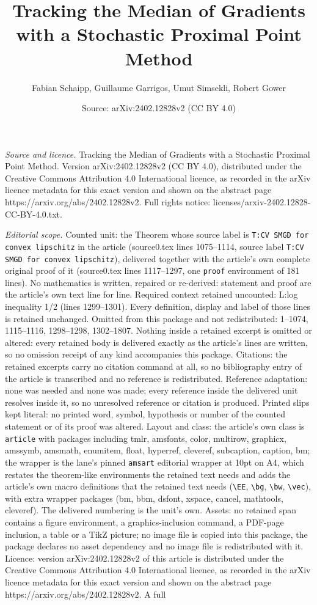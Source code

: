 \documentclass[10pt,a4paper]{amsart}
\title[Tracking the Median of Gradients with a Stochastic Proximal ]{Tracking the Median of Gradients with a Stochastic Proximal Point Method}
\author{Fabian Schaipp, Guillaume Garrigos, Umut Simsekli, Robert Gower}
\date{Source: arXiv:2402.12828v2 (CC BY 4.0)}
\begin{document}
\maketitle

\noindent\emph{Source and licence.} Tracking the Median of Gradients with a Stochastic Proximal Point Method. Version arXiv:2402.12828v2 (CC BY 4.0), distributed under the Creative Commons Attribution 4.0 International licence, as recorded in the arXiv licence metadata for this exact version and shown on the abstract page https://arxiv.org/abs/2402.12828v2. Full rights notice: licenses/arxiv-2402.12828-CC-BY-4.0.txt.\par\smallskip

\noindent\textit{Editorial scope.} Counted unit: the Theorem whose source label is \texttt{T:CV SMGD for convex lipschitz} in the article (source0.tex lines 1075--1114, source label \texttt{T:CV SMGD for convex lipschitz}), delivered together with the article's own complete original proof of it (source0.tex lines 1117--1297, one \texttt{proof} environment of 181 lines). No mathematics is written, repaired or re-derived: statement and proof are the article's own text line for line. Required context retained uncounted: L:log inequality 1/2 (lines 1299--1301). Every definition, display and label of those lines is retained unchanged. Omitted from this package and not redistributed: 1--1074, 1115--1116, 1298--1298, 1302--1807. Nothing inside a retained excerpt is omitted or altered: every retained body is delivered exactly as the article's lines are written, so no omission receipt of any kind accompanies this package. Citations: the retained excerpts carry no citation command at all, so no bibliography entry of the article is transcribed and no reference is redistributed. Reference adaptation: none was needed and none was made; every reference inside the delivered unit resolves inside it, so no unresolved reference or citation is produced. Printed slips kept literal: no printed word, symbol, hypothesis or number of the counted statement or of its proof was altered. Layout and class: the article's own class is \texttt{article} with packages including tmlr, amsfonts, color, multirow, graphicx, amssymb, amsmath, enumitem, float, hyperref, cleveref, subcaption, caption, bm; the wrapper is the lane's pinned \texttt{amsart} editorial wrapper at 10pt on A4, which restates the theorem-like environments the retained text needs and adds the article's own macro definitions that the retained text needs (\texttt{\textbackslash EE}, \texttt{\textbackslash bg}, \texttt{\textbackslash bw}, \texttt{\textbackslash vec}), with extra wrapper packages (bm, bbm, dsfont, xspace, cancel, mathtools, cleveref). The delivered numbering is the unit's own. Assets: no retained span contains a figure environment, a graphics-inclusion command, a PDF-page inclusion, a table or a TikZ picture; no image file is copied into this package, the package declares no asset dependency and no image file is redistributed with it. Licence: version arXiv:2402.12828v2 of this article is distributed under the Creative Commons Attribution 4.0 International licence, as recorded in the arXiv licence metadata for this exact version and shown on the abstract page https://arxiv.org/abs/2402.12828v2. A full 
\end{document}
